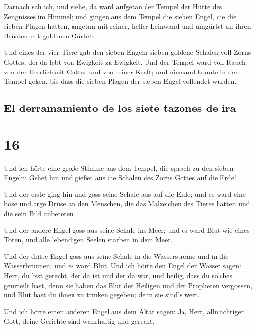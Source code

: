  Darnach sah ich, und siehe, da ward aufgetan der Tempel
der Hütte des Zeugnisses im Himmel;  und gingen aus dem
Tempel die sieben Engel, die die sieben Plagen hatten, angetan mit
reiner, heller Leinwand und umgürtet an ihren Brüsten mit goldenen
Gürteln.

 Und eines der vier Tiere gab den sieben Engeln sieben
goldene Schalen voll Zorns Gottes, der da lebt von Ewigkeit zu Ewigkeit.
 Und der Tempel ward voll Rauch von der Herrlichkeit
Gottes und von seiner Kraft; und niemand konnte in den Tempel gehen, bis
dass die sieben Plagen der sieben Engel vollendet wurden.

\hypertarget{el-derramamiento-de-los-siete-tazones-de-ira}{%
\subsection{El derramamiento de los siete tazones de
ira}\label{el-derramamiento-de-los-siete-tazones-de-ira}}

\hypertarget{section-15}{%
\section{16}\label{section-15}}

 Und ich hörte eine große Stimme aus dem Tempel, die
sprach zu den sieben Engeln: Gehet hin und gießet aus die Schalen des
Zorns Gottes auf die Erde!

 Und der erste ging hin und goss seine Schale aus auf die
Erde; und es ward eine böse und arge Drüse an den Menschen, die das
Malzeichen des Tieres hatten und die sein Bild anbeteten.

 Und der andere Engel goss aus seine Schale ins Meer; und
es ward Blut wie eines Toten, und alle lebendigen Seelen starben in dem
Meer.

 Und der dritte Engel goss aus seine Schale in die
Wasserströme und in die Wasserbrunnen; und es ward Blut. 
Und ich hörte den Engel der Wasser sagen: Herr, du bist gerecht, der da
ist und der da war, und heilig, dass du solches geurteilt hast,
 denn sie haben das Blut der Heiligen und der Propheten
vergossen, und Blut hast du ihnen zu trinken gegeben; denn sie sind's
wert.

 Und ich hörte einen anderen Engel aus dem Altar sagen:
Ja, Herr, allmächtiger Gott, deine Gerichte sind wahrhaftig und gerecht.


